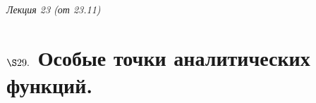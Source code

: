 \begin{flushright}
    \textit{Лекция 23 (от 23.11)}
\end{flushright}
\section{$\S 29.$ Особые точки аналитических функций.}
